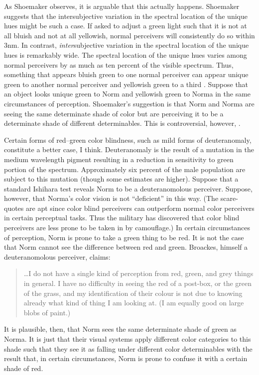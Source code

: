 \documentclass[12pt]{article}
\begin{document}
As Shoemaker observes, it is arguable that this actually happens. Shoemaker suggests that the intersubjective variation in the spectral location of the unique hues might be such a case. If asked to adjust a green light such that it is not at all bluish and not at all yellowish, normal perceivers will consistently do so within 3nm. In contrast, \emph{inter}subjective variation in the spectral location of the unique hues is remarkably wide. The spectral location of the unique hues varies among normal perceivers by as much as ten percent of the visible spectrum. Thus, something that appears bluish green to one normal perceiver can appear unique green to another normal perceiver and yellowish green to a third \citep[see][]{Leon-M.-Hurvich:1968fu}. Suppose that an object looks unique green to Norm and yellowish green to Norma in the same circumstances of perception. Shoemaker's suggestion is that Norm and Norma are seeing the same determinate shade of color but are perceiving it to be a determinate shade of different determinables. This is controversial, however, \citep[see][for some alternatives]{Byrne:2007qy,Cohen:2006fj,Cohen:2007kx,Kalderon:2006tg,Tye:2006lr,Tye:2006yq, Triplett:2007uq}. 

Certain forms of red--green color blindness, such as mild forms of deuteranomaly, constitute a better case, I think. Deuteranomaly is the result of a mutation in the medium wavelength pigment resulting in a reduction in sensitivity to green portion of the spectrum. Approximately six percent of the male population are subject to this mutation (though some estimates are higher). Suppose that a standard Ishihara test reveals Norm to be a deuteranomolous perceiver. Suppose, however, that Norma's color vision is not ``deficient'' in this way. (The scare-quotes are apt since color blind perceivers can outperform normal color perceivers in certain perceptual tasks. Thus the military has discovered that color blind perceivers are less prone to be taken in by camouflage.) In certain circumstances of perception, Norm is prone to take a green thing to be red. It is not the case that Norm cannot see the difference between red and green. Broackes, himself a deuteranomolous perceiver, claims: 
\begin{quote}
	\ldots I do not have a single kind of perception from red, green, and grey things in general. I have no difficulty in seeing the red of a post-box, or the green of the grass, and my identification of their colour is not due to knowing already what kind of thing I am looking at. (I am equally good on large blobs of paint.) \cite[p.\ 216]{Broackes:1997pa} 
\end{quote}
It is plausible, then, that Norm sees the same determinate shade of green as Norma. It is just that their visual systems apply different color categories to this shade such that they see it as falling under different color determinables with the result that, in certain circumstances, Norm is prone to confuse it with a certain shade of red. %
\end{document}
